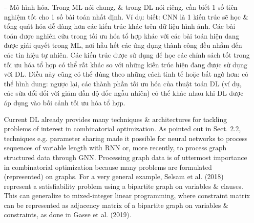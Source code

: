 \documentclass{article}
\begin{document}
\begin{itemize}
\begin{itemize}
        -- {\sf Mô hình hóa.} Trong ML nói chung, \& trong DL nói riêng, cần biết 1 số tiên nghiệm tốt cho 1 số bài toán nhất định. Ví dụ: biết: CNN là 1 kiến trúc sẽ học \& tổng quát hóa dễ dàng hơn các kiến trúc khác trên dữ liệu hình ảnh. Các bài toán được nghiên cứu trong tối ưu hóa tổ hợp khác với các bài toán hiện đang được giải quyết trong ML, nơi hầu hết các ứng dụng thành công đều nhắm đến các tín hiệu tự nhiên. Các kiến trúc được sử dụng để học các chính sách tốt trong tối ưu hóa tổ hợp có thể rất khác so với những kiến trúc hiện đang được sử dụng với DL. Điều này cũng có thể đúng theo những cách tinh tế hoặc bất ngờ hơn: có thể hình dung: ngược lại, các thành phần tối ưu hóa của thuật toán DL (ví dụ, các sửa đổi đối với giảm dần độ dốc ngẫu nhiên) có thể khác nhau khi DL được áp dụng vào bối cảnh tối ưu hóa tổ hợp.

        Current DL already provides many techniques \& architectures for tackling problems of interest in combinatorial optimization. As pointed out in Sect. 2.2, techniques e.g. parameter sharing made it possible for neural networks to process sequences of variable length with RNN or, more recently, to process graph structured data through GNN. Processing graph data is of uttermost importance in combinatorial optimization because many problems are formulated (represented) on graphs. For a very general example, Selsam et al. (2018) represent a satisﬁability problem using a bipartite graph on variables \& clauses. This can generalize to mixed-integer linear programming, where constraint matrix can be represented as adjacency matrix of a bipartite graph on variables \& constraints, as done in Gasse et al. (2019).


\end{itemize}
\end{itemize}
\end{document}
